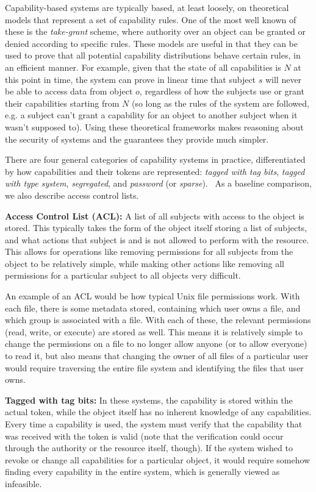 Capability-based systems are typically based, at least loosely, on theoretical models that represent a set of capability rules. One of the most well known of these is the {\em take-grant} scheme, where authority over an object can be granted or denied according to specific rules.\cite{lipton1977} These models are useful in that they can be used to prove that all potential capability distributions behave certain rules, in an efficient manner. For example, given that the state of all capabilities is $N$ at this point in time, the system can prove in linear time that subject $s$ will never be able to access data from object $o$, regardless of how the subjects use or grant their capabilities starting from $N$ (so long as the rules of the system are followed, e.g. a subject can't grant a capability for an object to another subject when it wasn't supposed to). Using these theoretical frameworks makes reasoning about the security of systems and the guarantees they provide much simpler.

There are four general categories of capability systems in practice, differentiated by how capabilities and their tokens are represented: {\em tagged with tag bits}, {\em tagged with type system}, {\em segregated}, and {\em password} (or {\em sparse}).~\cite{nevillmasters} As a baseline comparison, we also describe access control lists.

{\bf Access Control List (ACL):} A list of all subjects with access to the object is stored. This typically takes the form of the object itself storing a list of subjects, and what actions that subject is and is not allowed to perform with the resource. This allows for operations like removing permissions for all subjects from the object to be relatively simple, while making other actions like removing all permissions for a particular subject to all objects very difficult.

An example of an ACL would be how typical Unix file permissions work. With each file, there is some metadata stored, containing which user owns a file, and which group is associated with a file. With each of these, the relevant permissions (read, write, or execute) are stored as well. This means it is relatively simple to change the permissions on a file to no longer allow anyone (or to allow everyone) to read it, but also means that changing the owner of all files of a particular user would require traversing the entire file system and identifying the files that user owns. 

{\bf Tagged with tag bits:} In these systems, the capability is stored within the actual token, while the object itself has no inherent knowledge of any capabilities. Every time a capability is used, the system must verify that the capability that was received with the token is valid (note that the verification could occur through the authority or the resource itself, though). If the system wished to revoke or change all capabilities for a particular object, it would require somehow finding every capability in the entire system, which is generally viewed as infeasible. 

